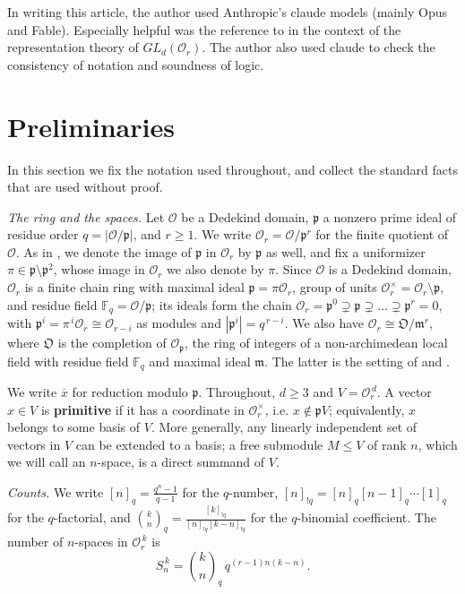 \documentclass[11pt]{article}
\numberwithin{equation}{section}
\theoremstyle{plain}
\theoremstyle{definition}
\begin{document}
In writing this article, the author used Anthropic's claude models (mainly Opus and Fable). Especially helpful was the reference to \cite{BO12} in the context of the representation theory of $GL_d(\mathcal{O}_r)$. The author also used claude to check the consistency of notation and soundness of logic.

\section{Preliminaries}\label{sec:2}

In this section we fix the notation used throughout, and collect the standard facts
that are used without proof.

\emph{The ring and the spaces.} Let $\mathcal{O}$ be a Dedekind domain, $\mathfrak{p}$ a nonzero prime ideal of residue order $q=|\mathcal{O}/\mathfrak{p}|$, and $r\ge1$. We write $\mathcal{O}_r=\mathcal{O}/\mathfrak{p}^r$ for the finite quotient of $\mathcal{O}$.
As in \cite{LP25}, we denote the image of $\mathfrak{p}$ in $\mathcal{O}_r$ by $\mathfrak{p}$ as well, and fix a uniformizer $\pi\in\mathfrak{p}\setminus\mathfrak{p}^2$, whose image in $\mathcal{O}_r$ we also denote by $\pi$.
Since $\mathcal{O}$ is a Dedekind domain, $\mathcal{O}_r$ is a finite chain ring with maximal ideal
$\mathfrak{p}=\pi\mathcal{O}_r$, group of units
$\mathcal{O}_r^{\times}=\mathcal{O}_r\setminus\mathfrak{p}$, and residue field
$\mathbb{F}_q=\mathcal{O}/\mathfrak{p}$; its ideals form the chain
$\mathcal{O}_r=\mathfrak{p}^0\supsetneq\mathfrak{p}\supsetneq\dots\supsetneq\mathfrak{p}^{r}=0$,
with $\mathfrak{p}^i=\pi^{\,i}\mathcal{O}_r\cong\mathcal{O}_{r-i}$ as modules and $|\mathfrak{p}^{i}|=q^{\,r-i}$. We also have
$\mathcal{O}_r\cong\mathfrak{O}/\mathfrak{m}^r$, where $\mathfrak{O}$ is the completion
of $\mathcal{O}_{\mathfrak{p}}$, the ring of integers of a non-archimedean local field
with residue field $\mathbb{F}_q$ and maximal ideal $\mathfrak{m}$. The latter is the
setting of \cite{BO12} and \cite{OS06}.

We write $\overline{x}$ for reduction modulo $\mathfrak{p}$. Throughout, $d\ge3$ and $V=\mathcal{O}_r^{\,d}$. A
vector $x\in V$ is \textbf{primitive} if it has a coordinate in $\mathcal{O}_r^{\times}$, i.e.
$x\notin\mathfrak{p}V$; equivalently, $x$ belongs to some basis of $V$. More generally, any linearly independent set of vectors in $V$ can be extended to a basis;
a free submodule $M\le V$ of rank $n$, which we will call an $n$-space, is a direct summand of $V$.

\emph{Counts.} We write $[n]_q=\frac{q^n-1}{q-1}$ for the $q$-number,
$[n]_{!q}=[n]_q[n-1]_q\cdots[1]_q$ for the $q$-factorial, and
$\binom kn_q=\frac{[k]_{!q}}{[n]_{!q}[k-n]_{!q}}$ for the $q$-binomial coefficient. The
number of $n$-spaces in $\mathcal{O}_r^{\,k}$ is \cite[Prop. 2.2]{LP25}
\begin{equation}\label{eq:S}
S^{\,k}_{n}=\binom{k}{n}_q\,q^{(r-1)n(k-n)} .
\end{equation}
\end{document}
